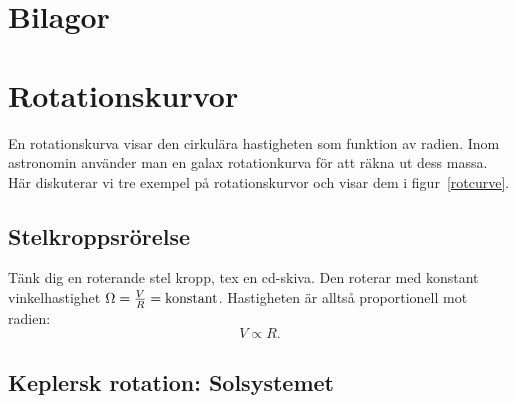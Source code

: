 \chapter*{Bilagor}
\appendix

\chapter{Rotationskurvor}\label{app-vrot}
\label{app:rotcurves}
En rotationskurva visar den cirkulära hastigheten som funktion av
radien. Inom astronomin använder man en galax rotationkurva för
att räkna ut dess massa. Här diskuterar vi tre exempel på
rotationskurvor och visar dem i figur~\ref{rotcurve}.

\section{Stelkroppsrörelse} 

Tänk dig en roterande stel kropp, tex en cd-skiva. Den roterar med
konstant vinkelhastighet $\Omega = \frac{V}{R} = {\rm
  konstant}$. Hastigheten är alltså proportionell mot radien:
\begin{equation}
V \propto R. 
\end{equation}


\section{Keplersk rotation: Solsystemet} 
\label{sect:kepler}

